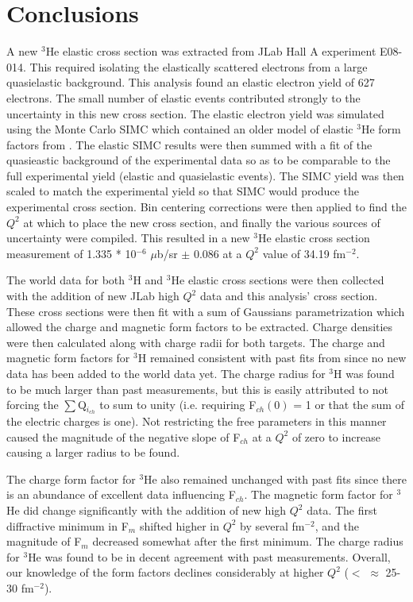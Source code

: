 \chapter{Conclusions} %
\label{ch:conclusions} %

A new $^3$He elastic cross section was extracted from JLab Hall A experiment E08-014. This required isolating the elastically scattered electrons from a large quasielastic background. This analysis found an elastic electron yield of 627 electrons. The small number of elastic events contributed strongly to the uncertainty in this new cross section. The elastic electron yield was simulated using the Monte Carlo SIMC which contained an older model of elastic $^3$He form factors from \cite{Article:Amroun}. The elastic SIMC results were then summed with a fit of the quasieastic background of the experimental data so as to be comparable to the full experimental yield (elastic and quasielastic events). The SIMC yield was then scaled to match the experimental yield so that SIMC would produce the experimental cross section. Bin centering corrections were then applied to find the $Q^2$ at which to place the new cross section, and finally the various sources of uncertainty were compiled. This resulted in a new $^3$He elastic cross section measurement of 1.335 * 10$^{-6}$ $\mu$b/sr $\pm$ 0.086 at a $Q^2$ value of 34.19 fm$^{-2}$. 

The world data for both $^3$H and $^3$He elastic cross sections were then collected with the addition of new JLab high $Q^2$ data and this analysis' cross section. These cross sections were then fit with a sum of Gaussians parametrization which allowed the charge and magnetic form factors to be extracted. Charge densities were then calculated along with charge radii for both targets. The charge and magnetic form factors for $^3$H remained consistent with past fits from \cite{Article:Amroun} since no new data has been added to the world data yet. The charge radius for $^3$H was found to be much larger than past measurements, but this is easily attributed to not forcing the $\sum$Q$_{i_{ch}}$ to sum to unity (i.e. requiring F$_{ch}(0)$ = 1 or that the sum of the electric charges is one). Not restricting the free parameters in this manner caused the magnitude of the negative slope of F$_{ch}$ at a $Q^2$ of zero to increase causing a larger radius to be found.

The charge form factor for $^3$He also remained unchanged with past fits since there is an abundance of excellent data influencing F$_{ch}$. The magnetic form factor for $^3$He did change significantly with the addition of new high $Q^2$ data. The first diffractive minimum in F$_m$ shifted higher in $Q^2$ by several fm$^{-2}$, and the magnitude of F$_m$ decreased somewhat after the first minimum. The charge radius for $^3$He was found to be in decent agreement with past measurements. Overall, our knowledge of the form factors declines considerably at higher $Q^2$ ($<$ $\approx$ 25-30 fm$^{-2}$). 


